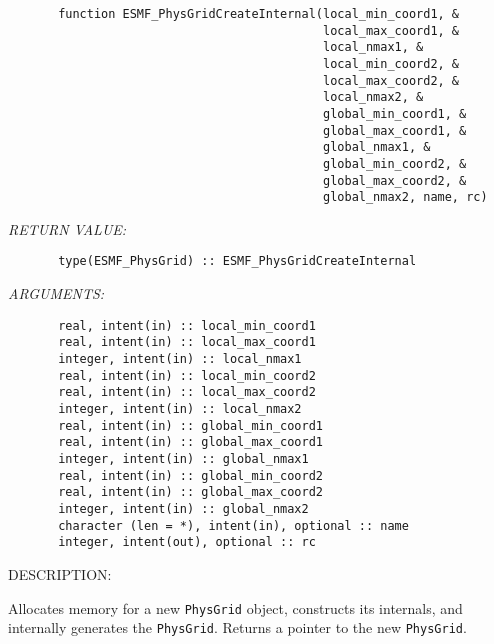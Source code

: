 \begin{verbatim}       function ESMF_PhysGridCreateInternal(local_min_coord1, &
                                            local_max_coord1, &
                                            local_nmax1, &
                                            local_min_coord2, &
                                            local_max_coord2, &
                                            local_nmax2, &
                                            global_min_coord1, &
                                            global_max_coord1, &
                                            global_nmax1, &
                                            global_min_coord2, &
                                            global_max_coord2, &
                                            global_nmax2, name, rc)\end{verbatim}{\em RETURN VALUE:}
\begin{verbatim}       type(ESMF_PhysGrid) :: ESMF_PhysGridCreateInternal\end{verbatim}{\em ARGUMENTS:}
\begin{verbatim}       real, intent(in) :: local_min_coord1
       real, intent(in) :: local_max_coord1
       integer, intent(in) :: local_nmax1
       real, intent(in) :: local_min_coord2
       real, intent(in) :: local_max_coord2
       integer, intent(in) :: local_nmax2
       real, intent(in) :: global_min_coord1
       real, intent(in) :: global_max_coord1
       integer, intent(in) :: global_nmax1
       real, intent(in) :: global_min_coord2
       real, intent(in) :: global_max_coord2
       integer, intent(in) :: global_nmax2
       character (len = *), intent(in), optional :: name
       integer, intent(out), optional :: rc               \end{verbatim}
{\sf DESCRIPTION:\\ }


       Allocates memory for a new {\tt PhysGrid} object, constructs its
       internals, and internally generates the {\tt PhysGrid}.  Returns a
       pointer to the new {\tt PhysGrid}.
  
